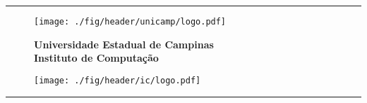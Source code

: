 \begin{center}
\rule{\textwidth}{1pt}
\end{center}

\vspace*{-0.2cm}

\begin{figure}[!ht]
    \begin{minipage}[b]{2.3cm}
        \centering
        \texttt{[image: ./fig/header/unicamp/logo.pdf]}
    \end{minipage}
    \begin{minipage}[b]{11.1cm}
        \centering
        \hspace*{0.4cm}
        {\large \bf Universidade Estadual de Campinas} \\[0.2cm]
        {\large \bf Instituto de Computação}
    \end{minipage}
    \begin{minipage}[b]{2.3cm}
        \centering
        \texttt{[image: ./fig/header/ic/logo.pdf]}
    \end{minipage}
\end{figure}

\vspace*{-0.2cm}

\begin{center}
    \rule{\textwidth}{1pt}
\end{center}

\vspace*{0.3cm}